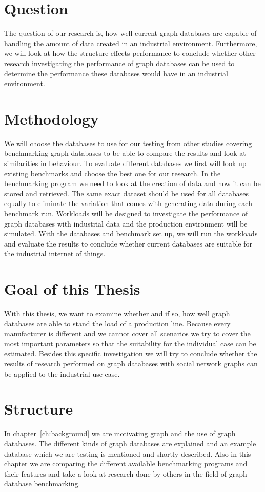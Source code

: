 \section{Question}
The question of our research is,
how well current graph databases are capable of handling the amount of data created in an industrial environment.
Furthermore,
we will look at how the structure effects performance to conclude whether other research investigating the performance of graph databases can be used to determine the performance these databases would have in an industrial environment.

\section{Methodology}
We will choose the databases to use for our testing from other studies covering benchmarking graph databases to be able to compare the results and look at similarities in behaviour.
To evaluate different databases we first will look up existing benchmarks and choose the best one for our research.
In the benchmarking program we need to look at the creation of data and how it can be stored and retrieved.
The same exact dataset should be used for all databases equally to eliminate the variation that comes with generating data during each benchmark run.
Workloads will be designed to investigate the performance of graph databases with industrial data and the production environment will be simulated.
With the databases and benchmark set up,
we will run the workloads and evaluate the results to conclude whether current databases are suitable for the industrial internet of things.

\section{Goal of this Thesis}
With this thesis,
we want to examine whether and if so,
how well graph databases are able to stand the load of a production line.
Because every manufacturer is different and we cannot cover all scenarios we try to cover the most important parameters
so that the suitability for the individual case can be estimated.
Besides this specific investigation we will try to conclude whether the results of research performed on graph databases with social network graphs can be applied to the industrial use case.

\section{Structure}
In chapter~\ref{ch:background} we are motivating graph and the use of graph databases.
The different kinds of graph databases are explained and an example database which we are testing is mentioned and shortly described.
Also in this chapter we are comparing the different available benchmarking programs and their features and take a look at research done by others in the field of graph database benchmarking.

